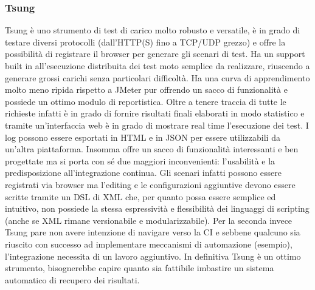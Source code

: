 \subsubsection{Tsung}
Tsung è uno strumento di test di carico molto robusto e versatile, è in grado di testare diversi protocolli (dall’HTTP(S) fino a TCP/UDP grezzo) e offre la possibilità di registrare il browser per generare gli scenari di test. Ha un support built in all’esecuzione distribuita dei test moto semplice da realizzare, riuscendo a generare grossi carichi senza particolari difficoltà.
Ha una curva di apprendimento molto meno ripida rispetto a JMeter pur offrendo un sacco di funzionalità e possiede un ottimo modulo di reportistica.
Oltre a tenere traccia di tutte le richieste infatti è in grado di fornire risultati finali elaborati in modo statistico e tramite un’interfaccia web è in grado di mostrare real time l’esecuzione dei test. I log possono essere esportati in HTML e in JSON per essere utilizzabili da un’altra piattaforma.
Insomma offre un sacco di funzionalità interessanti e ben progettate ma si porta con sé due maggiori inconvenienti: l’usabilità e la predisposizione all’integrazione continua.
Gli scenari infatti possono essere registrati via browser ma l’editing e le configurazioni aggiuntive devono essere scritte tramite un DSL di XML che, per quanto possa essere semplice ed intuitivo, non possiede la stessa espressività e flessibilità dei linguaggi di scripting (anche se XML rimane versionabile e modularizzabile).
Per la seconda invece Tsung pare non avere intenzione di navigare verso la CI e sebbene qualcuno sia riuscito con successo ad implementare meccanismi di automazione (esempio), l’integrazione necessita di un lavoro aggiuntivo.
In definitiva Tsung è un ottimo strumento, bisognerebbe capire quanto sia fattibile imbastire un sistema automatico di recupero dei risultati.
